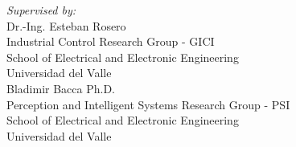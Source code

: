 \begin{titlepage}
\begin{minipage}{.95\linewidth}

\setcounter{page}{3} 

\begin{flushleft}    
 \vspace{10.0cm}
 \textit{Supervised by:}\\
 \vspace{2.5cm}
	Dr.-Ing. Esteban Rosero\\ 
	Industrial Control Research Group - GICI\\
	School of Electrical and Electronic Engineering\\
	Universidad del Valle\\
 \vspace{2.5cm}	
	Bladimir Bacca Ph.D.\\
	Perception and Intelligent Systems Research Group - PSI\\
	School of Electrical and Electronic Engineering\\
	Universidad del Valle\\
\end{flushleft} 
\end{minipage}
\hfill
\end{titlepage}
